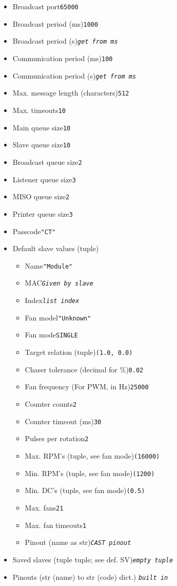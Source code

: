 \documentclass{article}
\newcommand{\dt}[1]{\dotfill \texttt{#1}}
\newcommand{\vp}{\vspace{1em}}
\newcommand{\et}{\textit{empty tuple}}
\begin{document}
\begin{multicols}{2}
\begin{itemize}
    \begin{itemize}
    \item Broadcast port\dt{65000}
    \item Broadcast period (ms)\dt{1000}
    \item Broadcast period (s)\dt{\textit{get from ms}}
    \item Communication period (ms)\dt{100}
    \item Communication period (s)\dt{\textit{get from ms}}
    \item Max. message length (characters)\dt{512}
    \item Max. timeouts\dt{10}
    \vp
    \item Main queue size\dt{10}
    \item Slave queue size\dt{10}
    \item Broadcast queue size\dt{2}
    \item Listener queue size\dt{3}
    \item MISO queue size\dt{2}
    \item Printer queue size\dt{3}
    \item Passcode\dt{"CT"}
    \vp
    \item Default slave values (tuple)\dt{}
        \begin{itemize}
            \item Name\dt{"Module"}
            \item MAC\dt{\textit{Given by slave}}
            \item Index\dt{\textit{list index}}
            \vp
            \item Fan model\dt{"Unknown"}
            \item Fan mode\dt{SINGLE}
            \item Target relation (tuple)\dt{(1.0, 0.0)}
            \item Chaser tolerance (decimal for \%)\dt{0.02}
            \item Fan frequency (For PWM, in Hz)\dt{25000}
            \item Counter counts\dt{2}
            \item Counter timeout (ms)\dt{30}
            \item Pulses per rotation\dt{2}
            \item Max. RPM's (tuple, see fan mode)\dt{(16000)}
            \item Min. RPM's (tuple, see fan mode)\dt{(1200)}
            \item Min. DC's (tuple, see fan mode)\dt{(0.5)}
            \item Max. fans\dt{21}
            \item Max. fan timeouts\dt{1}
            \item Pinout (name as str)\dt{\textit{CAST pinout}}
        \end{itemize}
    \item Saved slaves (tuple tuple; see def. SV)\dt{\et}
    \item Pinouts (str (name) to str (code) dict.)
        \dt{\textit{built in}}
    \end{itemize}


\end{itemize}
\end{multicols}
\end{document}
